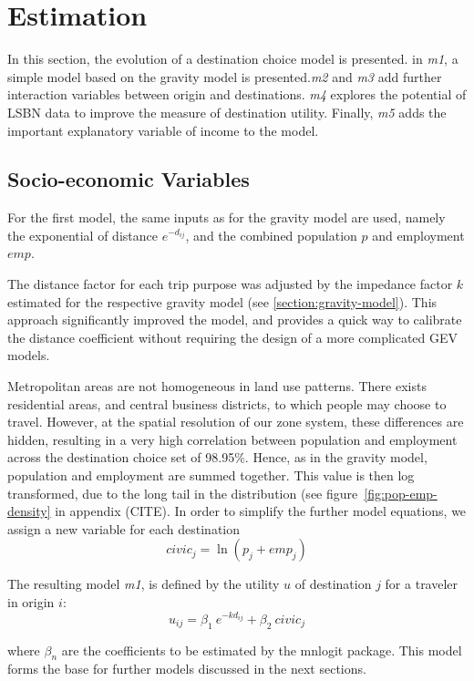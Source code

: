 \section{Estimation}
In this section, the evolution of a destination choice model is presented. in \textit{m1}, a simple model based on the gravity model is presented.\textit{m2} and \textit{m3} add further interaction variables between origin and destinations. \textit{m4} explores the potential of LSBN data to improve the measure of destination utility. Finally, \textit{m5} adds the important explanatory variable of income to the model.

\subsection{Socio-economic Variables}
For the first model, the same inputs as for the gravity model are used, namely the exponential of distance $e^{-d_{ij}}$, and the combined population $p$ and employment $emp$.

The distance factor for each trip purpose was adjusted by the impedance factor $k$ estimated for the respective gravity model (see \ref{section:gravity-model}). This approach significantly improved the model, and provides a quick way to calibrate the distance coefficient without requiring the design of a more complicated GEV models.

Metropolitan areas are not homogeneous in land use patterns. There exists residential areas, and central business districts, to which people may choose to travel. However, at the spatial resolution of our zone system, these differences are hidden, resulting in a very high correlation between population and employment across the destination choice set of 98.95\%. Hence, as in the gravity model, population and employment are summed together. This value is  then log transformed, due to the long tail in the distribution (see figure~\ref{fig:pop-emp-density} in appendix (CITE). In order to simplify the further model equations, we assign a new variable for each destination
$$ civic_j = \ln\left( p_j + emp_j \right) $$

The resulting model \textit{m1}, is defined by the utility $u$ of destination $j$ for a traveler in origin $i$: 
$$ u_{ij} = \beta_1~e^{-k d_{ij}} + \beta_2~civic_j $$

where $\beta_n$ are the coefficients to be estimated by the mnlogit package. This model forms the base for further models discussed in the next sections. 

